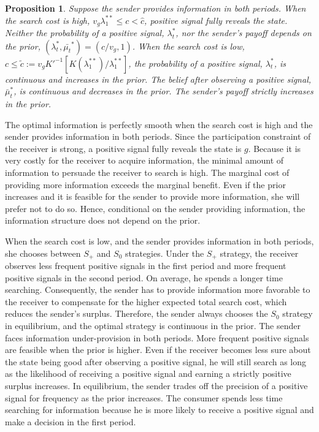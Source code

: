\documentclass[11pt]{extarticle}
\newtheorem{proposition}{Proposition}
\begin{document}
\begin{proposition}\label{strategy2cl}
	Suppose the sender provides information in both periods. When the search cost is high, $v_g\lambda_1^{**} \leq c < \widehat{c}$, positive signal fully reveals the state. Neither the probability of a positive signal, $\lambda_t^*$, nor the sender's payoff depends on the prior, $(\lambda_t^*,\bar{\mu_t}^*)=(c/v_g,1)$. When the search cost is low, $c \leq \tilde{c} := v_g K'^{-1}\left[K(\lambda_1^{**})/ \lambda_1^{**}\right]$, the probability of a positive signal, $\lambda_{t}^*$, is continuous and increases in the prior. The belief after observing a positive signal, $\bar{\mu}_t^*$, is continuous and decreases in the prior. The sender's payoff strictly increases in the prior.
\end{proposition}

The optimal information is perfectly smooth when the search cost is high and the sender provides information in both periods. Since the participation constraint of the receiver is strong, a positive signal fully reveals the state is $g$. Because it is very costly for the receiver to acquire information, the minimal amount of information to persuade the receiver to search is high. The marginal cost of providing more information exceeds the marginal benefit. Even if the prior increases and it is feasible for the sender to provide more information, she will prefer not to do so. Hence, conditional on the sender providing information, the information structure does not depend on the prior.

When the search cost is low, and the sender provides information in both periods, she chooses between $S_+$ and $S_0$ strategies. Under the $S_+$ strategy, the receiver observes less frequent positive signals in the first period and more frequent positive signals in the second period. On average, he spends a longer time searching. Consequently, the sender has to provide information more favorable to the receiver to compensate for the higher expected total search cost, which reduces the sender's surplus. Therefore, the sender always chooses the $S_0$ strategy in equilibrium, and the optimal strategy is continuous in the prior. The sender faces information under-provision in both periods. More frequent positive signals are feasible when the prior is higher. Even if the receiver becomes less sure about the state being good after observing a positive signal, he will still search as long as the likelihood of receiving a positive signal and earning a strictly positive surplus increases. In equilibrium, the sender trades off the precision of a positive signal for frequency as the prior increases. The consumer spends less time searching for information because he is more likely to receive a positive signal and make a decision in the first period.
\end{document}
